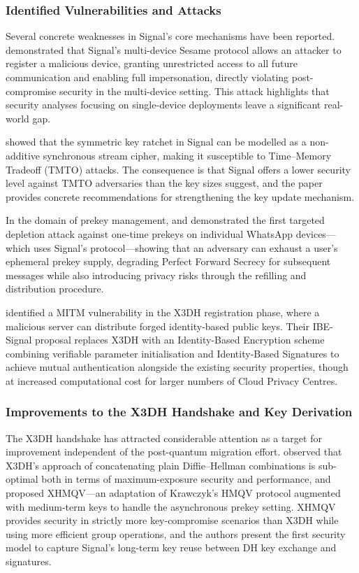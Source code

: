 \subsubsection{Identified Vulnerabilities and Attacks}

Several concrete weaknesses in Signal's core mechanisms have been reported. \textcite{wichelmann2021} demonstrated that Signal's multi-device Sesame protocol allows an attacker to register a malicious device, granting unrestricted access to all future communication and enabling full impersonation, directly violating post-compromise security in the multi-device setting. This attack highlights that security analyses focusing on single-device deployments leave a significant real-world gap.

\textcite{mattsson2023} showed that the symmetric key ratchet in Signal can be modelled as a non-additive synchronous stream cipher, making it susceptible to Time--Memory Tradeoff (TMTO) attacks. The consequence is that Signal offers a lower security level against TMTO adversaries than the key sizes suggest, and the paper provides concrete recommendations for strengthening the key update mechanism.

In the domain of prekey management, \textcite{gegenhuber2025} and \textcite{gegenhuber2025b} demonstrated the first targeted depletion attack against one-time prekeys on individual WhatsApp devices—which uses Signal's protocol—showing that an adversary can exhaust a user's ephemeral prekey supply, degrading Perfect Forward Secrecy for subsequent messages while also introducing privacy risks through the refilling and distribution procedure.

\textcite{liu2022} identified a MITM vulnerability in the X3DH registration phase, where a malicious server can distribute forged identity-based public keys. Their IBE-Signal proposal replaces X3DH with an Identity-Based Encryption scheme combining verifiable parameter initialisation and Identity-Based Signatures to achieve mutual authentication alongside the existing security properties, though at increased computational cost for larger numbers of Cloud Privacy Centres.

\subsubsection{Improvements to the X3DH Handshake and Key Derivation}

The X3DH handshake has attracted considerable attention as a target for improvement independent of the post-quantum migration effort. \textcite{fiedler2025} observed that X3DH's approach of concatenating plain Diffie--Hellman combinations is sub-optimal both in terms of maximum-exposure security and performance, and proposed XHMQV—an adaptation of Krawczyk's HMQV protocol augmented with medium-term keys to handle the asynchronous prekey setting. XHMQV provides security in strictly more key-compromise scenarios than X3DH while using more efficient group operations, and the authors present the first security model to capture Signal's long-term key reuse between DH key exchange and signatures.

